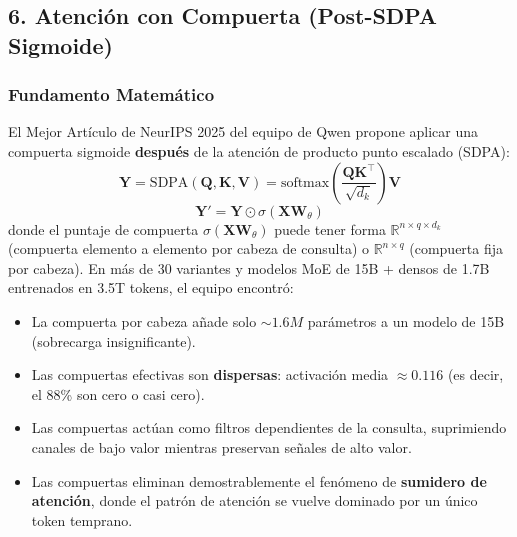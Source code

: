 \documentclass[11pt,a4paper]{article}
\begin{document}
\subsection{6. Atención con Compuerta (Post-SDPA Sigmoide)}

\subsubsection{Fundamento Matemático}

El Mejor Artículo de NeurIPS 2025 del equipo de Qwen propone aplicar una compuerta sigmoide \textbf{después} de la atención de producto punto escalado (SDPA):
\[
\mathbf{Y} = \text{SDPA}(\mathbf{Q}, \mathbf{K}, \mathbf{V}) = \text{softmax}\left(\frac{\mathbf{Q}\mathbf{K}^\top}{\sqrt{d_k}}\right) \mathbf{V}
\]
\[
\mathbf{Y}' = \mathbf{Y} \odot \sigma\left(\mathbf{X} \mathbf{W}_\theta\right)
\]
donde el puntaje de compuerta $\sigma(\mathbf{X} \mathbf{W}_\theta)$ puede tener forma $\mathbb{R}^{n \times q \times d_k}$ (compuerta elemento a elemento por cabeza de consulta) o $\mathbb{R}^{n \times q}$ (compuerta fija por cabeza). En más de 30 variantes y modelos MoE de 15B + densos de 1.7B entrenados en 3.5T tokens, el equipo encontró:

\begin{itemize}[leftmargin=*]
    \item La compuerta por cabeza añade solo $\sim 1.6M$ parámetros a un modelo de 15B (sobrecarga insignificante).
    \item Las compuertas efectivas son \textbf{dispersas}: activación media $\approx 0.116$ (es decir, el 88\% son cero o casi cero).
    \item Las compuertas actúan como filtros dependientes de la consulta, suprimiendo canales de bajo valor mientras preservan señales de alto valor.
    \item Las compuertas eliminan demostrablemente el fenómeno de \textbf{sumidero de atención}, donde el patrón de atención se vuelve dominado por un único token temprano.
\end{itemize}
\end{document}
